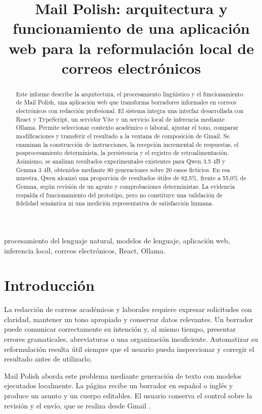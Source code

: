 \documentclass[conference]{IEEEtran}
\title{Mail Polish: arquitectura y funcionamiento de una aplicación web para la reformulación local de correos electrónicos}
\author{\IEEEauthorblockN{Juan Diego Letona}
\IEEEauthorblockA{Carné: 20230285}}
\begin{document}
\maketitle

\begin{abstract}
Este informe describe la arquitectura, el procesamiento lingüístico y el funcionamiento de Mail Polish, una aplicación web que transforma borradores informales en correos electrónicos con redacción profesional. El sistema integra una interfaz desarrollada con React y TypeScript, un servidor Vite y un servicio local de inferencia mediante Ollama. Permite seleccionar contexto académico o laboral, ajustar el tono, comparar modificaciones y transferir el resultado a la ventana de composición de Gmail. Se examinan la construcción de instrucciones, la recepción incremental de respuestas, el posprocesamiento determinista, la persistencia y el registro de retroalimentación. Asimismo, se analizan resultados experimentales existentes para Qwen 3.5 4B y Gemma 3 4B, obtenidos mediante 80 generaciones sobre 20 casos ficticios. En esa muestra, Qwen alcanzó una proporción de resultados útiles de 82,5\%, frente a 55,0\% de Gemma, según revisión de un agente y comprobaciones deterministas. La evidencia respalda el funcionamiento del prototipo, pero no constituye una validación de fidelidad semántica ni una medición representativa de satisfacción humana.
\end{abstract}

\begin{IEEEkeywords}
procesamiento del lenguaje natural, modelos de lenguaje, aplicación web, inferencia local, correos electrónicos, React, Ollama.
\end{IEEEkeywords}

\section{Introducción}
La redacción de correos académicos y laborales requiere expresar solicitudes con claridad, mantener un tono apropiado y conservar datos relevantes. Un borrador puede comunicar correctamente su intención y, al mismo tiempo, presentar errores gramaticales, abreviaturas o una organización insuficiente. Automatizar su reformulación resulta útil siempre que el usuario pueda inspeccionar y corregir el resultado antes de utilizarlo.

Mail Polish aborda este problema mediante generación de texto con modelos ejecutados localmente. La página recibe un borrador en español o inglés y produce un asunto y un cuerpo editables. El usuario conserva el control sobre la revisión y el envío, que se realiza desde Gmail \cite{readme,app}.
\end{document}
